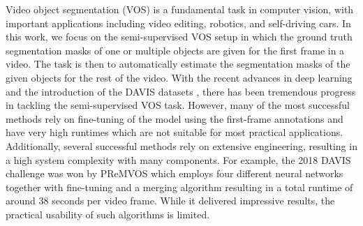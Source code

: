 \documentclass[10pt,twocolumn,letterpaper]{article}
\begin{document}
Video object segmentation (VOS) is a fundamental task in computer vision, with important applications including video editing, robotics, and self-driving cars. In this work, we focus on the semi-supervised VOS setup in which the ground truth segmentation masks of one or multiple objects are given for the first frame in a video. The task is then to automatically estimate the segmentation masks of the given objects for the rest of the video. With the recent advances in deep learning and the introduction of the DAVIS datasets \cite{DAVIS2016,DAVIS2017}, there has been tremendous progress in tackling the semi-supervised VOS task. However, many of the most successful methods rely on fine-tuning of the model using the first-frame annotations and have very high runtimes which are not suitable for most practical applications. Additionally, several successful methods rely on extensive engineering, resulting in a high system complexity with many components. For example, the 2018 DAVIS challenge was won by PReMVOS \cite{Luiten18ACCV, Luiten18DAVIS, Luiten18ECCVW} which employs four different neural networks together with fine-tuning and a merging algorithm resulting in a total runtime of around 38 seconds per video frame. While it delivered impressive results, the practical usability of such algorithms is limited.

\begin{table}
\begin{centering}
\par\end{centering}
\caption{\label{tab:design-goals}Design goals overview. The table shows which
of our design goals (described in more detail in the text) are achieved
by recent methods. Our method is the only one which fulfills all design goals.}
\end{table}
\end{document}
